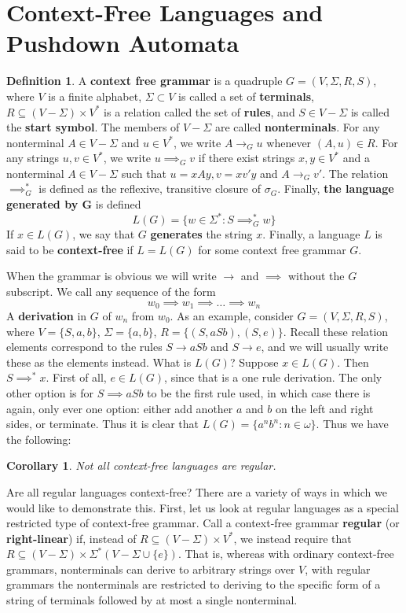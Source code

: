 \documentclass{article}
\theoremstyle{definition}
\newtheorem{definition}{Definition}[section]
\theoremstyle{plain}
\theoremstyle{theorem}
\newtheorem{corollary}{Corollary}[section]
\begin{document}
\section{Context-Free Languages and Pushdown Automata}
\begin{definition}
	A \textbf{context free grammar} is a quadruple $G = (V,\Sigma,R,S)$, where $V$ is a finite alphabet, $\Sigma \subset V$ is called a set of \textbf{terminals}, $R \subseteq (V-\Sigma) \times V^*$ is a relation called the set of \textbf{rules}, and $S \in V-\Sigma$ is called the \textbf{start symbol}. The members of $V-\Sigma$ are called \textbf{nonterminals}. For any nonterminal $A \in V - \Sigma$ and $u \in V^*$, we write $A \to_G u$ whenever $(A,u) \in R$. For any strings $u,v \in V^*$, we write $u \implies_G v$ if there exist strings $x,y \in V^*$ and a nonterminal $A \in V-\Sigma$ such that $u = xAy, v = xv'y$ and $A \to_G v'$. The relation $\implies^*_G$ is defined as the reflexive, transitive closure of $\sigma_G$. Finally, \textbf{the language generated by G} is defined 
	\[ L(G) = \{w \in \Sigma^*: S \implies^*_G w\} \]
If $x \in L(G)$, we say that $G$ \textbf{generates} the string $x$. Finally, a language $L$ is said to be \textbf{context-free} if $L = L(G)$ for some context free grammar $G$. 
\end{definition}
When the grammar is obvious we will write $\to$ and $\implies$ without the $G$ subscript. We call any sequence of the form 
\[ w_0 \implies w_1 \implies \ldots \implies w_n \]
A \textbf{derivation} in $G$ of $w_n$ from $w_0$. 
As an example, consider $G = (V,\Sigma,R,S)$, where $V = \{S,a,b\}$, $\Sigma = \{a,b\}$, $R = \{(S,aSb),(S,e)\}$. Recall these relation elements correspond to the rules $S \to aSb$ and $S \to e$, and we will usually write these as the elements instead. What is $L(G)$? Suppose $x \in L(G)$. Then $S \implies^* x$. First of all, $e \in L(G)$, since that is a one rule derivation. The only other option is for $S \implies aSb$ to be the first rule used, in which case there is again, only ever one option: either add another $a$ and $b$ on the left and right sides, or terminate. Thus it is clear that $L(G) = \{a^nb^n: n \in \omega\}$. Thus we have the following:
\begin{corollary}
	Not all context-free languages are regular.
\end{corollary}
Are all regular languages context-free? There are a variety of ways in which we would like to demonstrate this. First, let us look at regular languages as a special restricted type of context-free grammar. Call a context-free grammar \textbf{regular} (or \textbf{right-linear}) if, instead of $R \subseteq (V - \Sigma)\times V^*$, we instead require that $R \subseteq (V-\Sigma) \times \Sigma^*(V-\Sigma \cup \{e\})$. That is, whereas with ordinary context-free grammars, nonterminals can derive to arbitrary strings over $V$, with regular grammars the nonterminals are restricted to deriving to the specific form of a string of terminals followed by at most a single nonterminal. 
\end{document}
